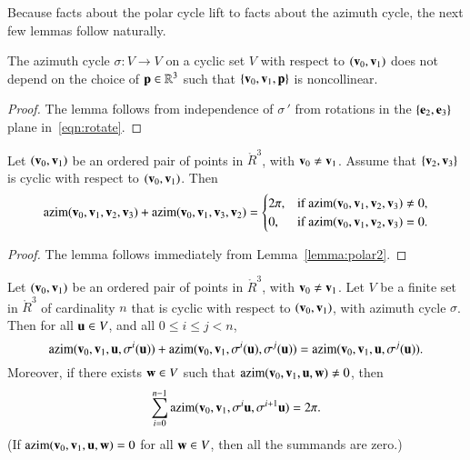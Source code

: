 Because facts about the polar cycle lift to facts about the azimuth cycle,
the next few lemmas follow naturally.


\begin{lemma}[] The azimuth cycle $\sigma:V\to V$ on
  a cyclic set $V$ with respect to $({\mathbf v}_0,{\mathbf v}_1)$ does not depend on
  the choice of ${\mathbf p}\in\mathbb{R}^3$ such that $\{{\mathbf v}_0,{\mathbf v}_1,{\mathbf p}\}$ is
  noncollinear.
\end{lemma}
%
%

\begin{proof} The lemma follows from independence of $\sigma\,'$ from
rotations in the $\{{\mathbf e}_2,{\mathbf e}_3\}$ plane  in~\eqref{eqn:rotate}.
\end{proof}


\begin{lemma}[] 
Let $({\mathbf v}_0,{\mathbf v}_1)$ be an ordered pair of points in $\ring{R}^3$,
with ${\mathbf v}_0\ne {\mathbf v}_1$.  Assume that $\{{\mathbf v}_2,{\mathbf v}_3\}$ is cyclic
with respect to $({\mathbf v}_0,{\mathbf v}_1)$.  Then
\[ 
{\operatorname{azim}}({\mathbf v}_0,{\mathbf v}_1,{\mathbf v}_2,{\mathbf v}_3) + {\operatorname{azim}}({\mathbf v}_0,{\mathbf v}_1,{\mathbf v}_3,{\mathbf v}_2) 
= \begin{cases} 2\pi, & \text{if }{\operatorname{azim}}({\mathbf v}_0,{\mathbf v}_1,{\mathbf v}_2,{\mathbf v}_3)\ne 0,\\
0, & \text{if }{\operatorname{azim}}({\mathbf v}_0,{\mathbf v}_1,{\mathbf v}_2,{\mathbf v}_3)=0.
\end{cases}
\] 
\end{lemma}
%

\begin{proof} The lemma follows immediately from Lemma~\ref{lemma:polar2}.
\end{proof}

\begin{lemma}[] \label{lemma:2pi-sum}
Let $({\mathbf v}_0,{\mathbf v}_1)$ be an ordered pair of points in $\ring{R}^3$,
with ${\mathbf v}_0\ne {\mathbf v}_1$.  Let $V$ be a finite set in $\ring{R}^3$ of
cardinality $n$ that
is cyclic with respect to $({\mathbf v}_0,{\mathbf v}_1)$,
with azimuth cycle $\sigma$.
Then for all ${\mathbf u}\in V$,
and all $0\le i \le j < n$,
\[ 
{\operatorname{azim}}({\mathbf v}_0,{\mathbf v}_1,{\mathbf u},\sigma^i({\mathbf u})) +
{\operatorname{azim}}({\mathbf v}_0,{\mathbf v}_1,\sigma^i({\mathbf u}),\sigma^j({\mathbf u})) =
{\operatorname{azim}}({\mathbf v}_0,{\mathbf v}_1,{\mathbf u},\sigma^j({\mathbf u})).
\] 
Moreover, if there exists ${\mathbf w}\in V$ such that 
${\operatorname{azim}}({\mathbf v}_0,{\mathbf v}_1,{\mathbf u},{\mathbf w})\ne0$,
then
\[ 
\sum_{i=0}^{n-1} {\operatorname{azim}}({\mathbf v}_0,{\mathbf v}_1,\sigma^i{\mathbf u},\sigma^{i+1}{\mathbf u}) = 2\pi.
\] 
(If ${\operatorname{azim}}({\mathbf v}_0,{\mathbf v}_1,{\mathbf u},{\mathbf w})=0$ for all ${\mathbf w}\in V$, then all the
summands are zero.)
\end{lemma}
%
%
%
%
%

